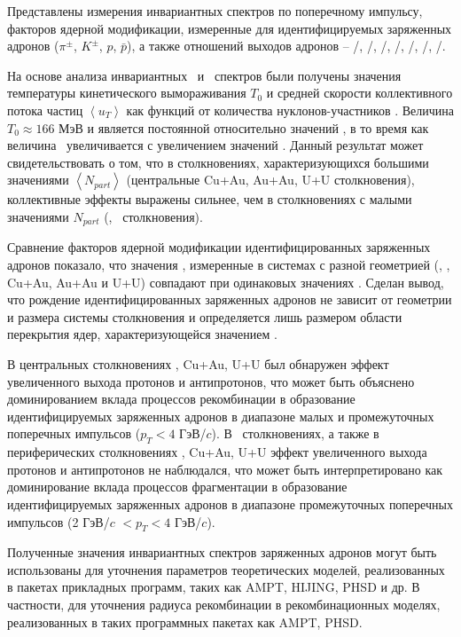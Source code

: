 Представлены измерения инвариантных спектров по поперечному импульсу, факторов ядерной модификации, измеренные для идентифицируемых заряженных адронов ($\pi^\pm$, $K^\pm$, $p$, $\bar{p}$), а также отношений выходов адронов -- \pim/\pip, \Km/\Kp, \prot/\aprot, \prot/\pip, \aprot/\pim, \Kp/\pip, \Km/\pim.

На основе анализа инвариантных \pt \ и \mt \ спектров были получены значения температуры кинетического вымораживания $T_{0}$ и средней скорости коллективного потока частиц $\left< u_T \right>$ как функций от количества нуклонов-участников \Npart.
Величина $T_{0}\approx166$ МэВ и является постоянной относительно значений \Npart, в то время как величина \ut \ увеличивается с увеличением значений \Npart. 
Данный результат может свидетельствовать о том, что в столкновениях, характеризующихся большими значениями $\left<N_{part}\right>$ (центральные Cu+Au, Au+Au, U+U столкновения), коллективные эффекты выражены сильнее, чем в столкновениях с малыми значениями $N_{part}$ (\pal, \heau \ столкновения).

Сравнение факторов ядерной модификации идентифицированных заряженных адронов показало, что значения \rab, измеренные в системах с разной геометрией (\dau, \heau, Cu+Au, Au+Au и U+U) совпадают при одинаковых значениях \Npart.
Сделан вывод, что рождение идентифицированных заряженных адронов не зависит от геометрии и размера системы столкновения и определяется лишь размером области перекрытия ядер, характеризующейся значением \Npart.

В центральных столкновениях \heau, Cu+Au, U+U был обнаружен эффект увеличенного выхода протонов и антипротонов, что может быть объяснено доминированием вклада процессов рекомбинации в образование идентифицируемых заряженных адронов в диапазоне малых и промежуточных поперечных импульсов ($p_{T}<4$ ГэВ/$c$). 
В \pal \ столкновениях, а также в периферических столкновениях \heau, Cu+Au, U+U эффект увеличенного выхода протонов и антипротонов не наблюдался, что может быть интерпретировано как доминирование вклада процессов фрагментации в образование идентифицируемых заряженных адронов в диапазоне промежуточных поперечных импульсов (2 ГэВ/$c$ $<p_{T}<4$ ГэВ/$c$).

Полученные значения инвариантных спектров заряженных адронов могут быть использованы для уточнения параметров теоретических моделей, реализованных в пакетах прикладных программ, таких как  AMPT, HIJING, PHSD и др. В частности, для уточнения радиуса рекомбинации в рекомбинационных моделях, реализованных в таких программных пакетах как AMPT, PHSD.